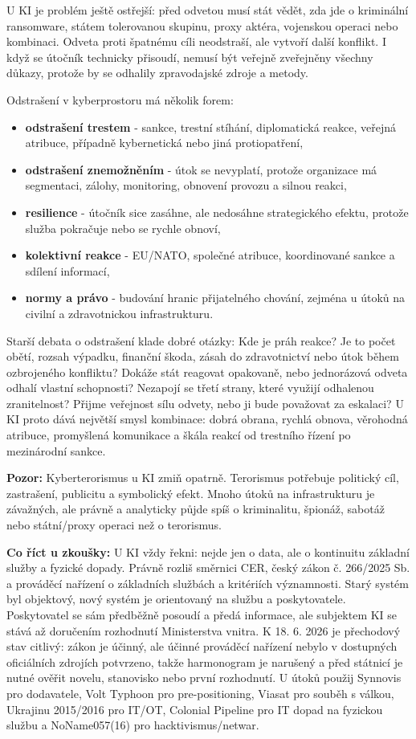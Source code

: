 \documentclass[11pt,a4paper]{article}
\newcommand{\zkouska}[1]{\begin{tcolorbox}[breakable,enhanced,colback=blue!7,colframe=blue!30!black,boxrule=0pt,arc=1mm,left=5pt,right=5pt,top=5pt,bottom=5pt,before skip=6pt,after skip=6pt]\textbf{Co říct u zkoušky:} #1\end{tcolorbox}}
\newcommand{\pozor}[1]{\begin{tcolorbox}[breakable,enhanced,colback=red!7,colframe=red!30!black,boxrule=0pt,arc=1mm,left=5pt,right=5pt,top=5pt,bottom=5pt,before skip=6pt,after skip=6pt]\textbf{Pozor:} #1\end{tcolorbox}}
\begin{document}
U KI je problém ještě ostřejší: před odvetou musí stát vědět, zda jde o kriminální ransomware, státem tolerovanou skupinu, proxy aktéra, vojenskou operaci nebo kombinaci. Odveta proti špatnému cíli neodstraší, ale vytvoří další konflikt. I když se útočník technicky přisoudí, nemusí být veřejně zveřejněny všechny důkazy, protože by se odhalily zpravodajské zdroje a metody.

Odstrašení v kyberprostoru má několik forem:
\begin{itemize}
  \item \textbf{odstrašení trestem} - sankce, trestní stíhání, diplomatická reakce, veřejná atribuce, případně kybernetická nebo jiná protiopatření,
  \item \textbf{odstrašení znemožněním} - útok se nevyplatí, protože organizace má segmentaci, zálohy, monitoring, obnovení provozu a silnou reakci,
  \item \textbf{resilience} - útočník sice zasáhne, ale nedosáhne strategického efektu, protože služba pokračuje nebo se rychle obnoví,
  \item \textbf{kolektivní reakce} - EU/NATO, společné atribuce, koordinované sankce a sdílení informací,
  \item \textbf{normy a právo} - budování hranic přijatelného chování, zejména u útoků na civilní a zdravotnickou infrastrukturu.
\end{itemize}

Starší debata o odstrašení klade dobré otázky: Kde je práh reakce? Je to počet obětí, rozsah výpadku, finanční škoda, zásah do zdravotnictví nebo útok během ozbrojeného konfliktu? Dokáže stát reagovat opakovaně, nebo jednorázová odveta odhalí vlastní schopnosti? Nezapojí se třetí strany, které využijí odhalenou zranitelnost? Přijme veřejnost sílu odvety, nebo ji bude považovat za eskalaci? U KI proto dává největší smysl kombinace: dobrá obrana, rychlá obnova, věrohodná atribuce, promyšlená komunikace a škála reakcí od trestního řízení po mezinárodní sankce.

\pozor{Kyberterorismus u KI zmiň opatrně. Terorismus potřebuje politický cíl, zastrašení, publicitu a symbolický efekt. Mnoho útoků na infrastrukturu je závažných, ale právně a analyticky půjde spíš o kriminalitu, špionáž, sabotáž nebo státní/proxy operaci než o terorismus.}

\zkouska{U KI vždy řekni: nejde jen o data, ale o kontinuitu základní služby a fyzické dopady. Právně rozliš směrnici CER, český zákon č. 266/2025 Sb. a prováděcí nařízení o základních službách a kritériích významnosti. Starý systém byl objektový, nový systém je orientovaný na službu a poskytovatele. Poskytovatel se sám předběžně posoudí a předá informace, ale subjektem KI se stává až doručením rozhodnutí Ministerstva vnitra. K 18. 6. 2026 je přechodový stav citlivý: zákon je účinný, ale účinné prováděcí nařízení nebylo v dostupných oficiálních zdrojích potvrzeno, takže harmonogram je narušený a před státnicí je nutné ověřit novelu, stanovisko nebo první rozhodnutí. U útoků použij Synnovis pro dodavatele, Volt Typhoon pro pre-positioning, Viasat pro souběh s válkou, Ukrajinu 2015/2016 pro IT/OT, Colonial Pipeline pro IT dopad na fyzickou službu a NoName057(16) pro hacktivismus/netwar.}
\end{document}
